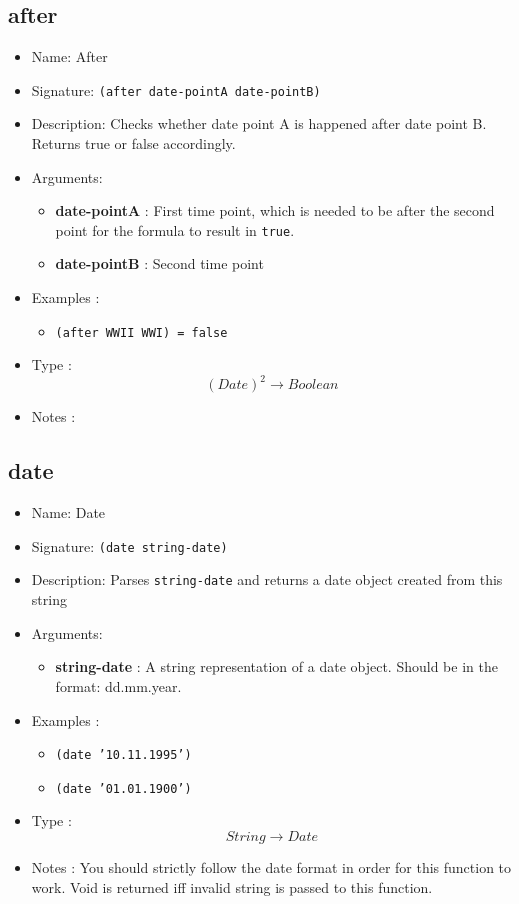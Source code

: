 \subsection{after}
\begin{itemize}
    \item Name: After
    \item Signature: \texttt{(after date-pointA date-pointB)}
    \item Description: Checks whether date point A is happened after date point B. Returns true or false accordingly.
    \item Arguments:
        \begin{itemize}
            \item \textbf{date-pointA} : First time point, which is needed to be after the second point for the formula to result in \texttt{true}.
            \item \textbf{date-pointB} : Second time point
        \end{itemize}
    \item Examples :
        \begin{itemize}
            \item \texttt{(after WWII WWI) = false}
        \end{itemize}
    \item Type : \[(Date)^2 \to Boolean\]
    \item Notes :
\end{itemize}

\subsection{date}
\begin{itemize}
    \item Name: Date
    \item Signature: \texttt{(date string-date)}
    \item Description: Parses \texttt{string-date} and returns a date object created from this string
    \item Arguments:
        \begin{itemize}
            \item \textbf{string-date} : A string representation of a date object. Should be in the format: dd.mm.year.
        \end{itemize}
    \item Examples :
        \begin{itemize}
            \item \texttt{(date '10.11.1995')}
            \item \texttt{(date '01.01.1900')}
        \end{itemize}
    \item Type : \[String \to Date\]
    \item Notes : You should strictly follow the date format in order for this function to work. Void is returned iff invalid string is passed to this function.
\end{itemize}

